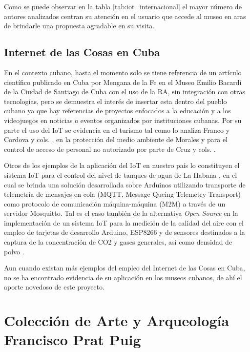     Como se puede observar en la tabla \ref{tab:iot_internacional} el mayor número de autores analizados centran su atención en el usuario que accede al museo en aras de brindarle una propuesta agradable en su visita.

    \subsection{Internet de las Cosas en Cuba}\label{sec:iotCuba} 

    En el contexto cubano, hasta el momento solo se tiene referencia de un artículo científico publicado en Cuba por Mengana de la Fe \cite{lopezramos} en el Museo Emilio Bacardí de la Ciudad de Santiago de Cuba con el uso de la RA,
    sin integración con otras tecnologías, pero se demuestra el interés de insertar esta dentro del pueblo cubano ya que hay referencias de proyectos enfocados a la educación y a los videojuegos en noticias o eventos organizados por instituciones cubanas.
    Por su parte el uso del IoT se evidencia en el turismo tal como lo analiza Franco \cite{franco} y Cordova y cols. \cite{cordovacorso}, en la protección del medio ambiente de Morales \cite{morales} y para el control de acceso de personal no autorizado por parte de Cruz y cols. \cite{cruzrojas}.

    Otros de los ejemplos de la aplicación del IoT en nuestro país lo constituyen el sistema IoT para el control del nivel de tanques de agua de La Habana \cite{herrera2020}, en el cual se brinda una solución desarrollada sobre Arduinos utilizando transporte de telemetría de mensajes en cola (MQTT, Message Queing Telemetry Transport)
    como protocolo de comunicación máquina-máquina (M2M) a través de un servidor Mosquitto. Tal es el caso también de la alternativa \textit{Open Source} en la implementación de un sistema IoT para la medición de la calidad del aire con el empleo de tarjetas de desarrollo Arduino, ESP8266 y de sensores destinados a la captura de la concentración de CO2 y gases generales, así como densidad de polvo \cite{ochoa2018alternativa}.
    
    Aun cuando existan más ejemplos del empleo del Internet de las Cosas en Cuba, no se ha encontrado evidencia de su aplicación en los museos cubanos, de ahí el aporte novedoso de este proyecto.

    \section{Colección de Arte y Arqueología Francisco Prat Puig}


